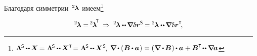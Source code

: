 \begin{otherlanguage}{russian}
\vspace{-0.16em}
Благодаря симметрии~${^2\hspace{-0.2ex}\bm{\lambda}}$ имеем\footnote{${%
\bm{\Lambda}^{\hspace{-0.16ex}\mathsf{S}} \hspace{-0.1ex} \dotdotp \hspace{-0.1ex} \bm{X} \hspace{-0.2ex} =
\hspace{.1ex} \bm{\Lambda}^{\hspace{-0.16ex}\mathsf{S}} \hspace{-0.1ex} \dotdotp \hspace{-0.1ex} \bm{X}^{\T} \hspace{-0.4ex} =
\hspace{.1ex} \bm{\Lambda}^{\hspace{-0.16ex}\mathsf{S}} \hspace{-0.1ex} \dotdotp \hspace{-0.1ex} \bm{X}^{\hspace{.1ex}\mathsf{S}}
\hspace{-0.25ex}}$,
\:\:
${%
\boldnabla \hspace{-0.1ex} \dotp \left( \hspace{.1ex} {\bm{B}} \hspace{-0.1ex} \dotp \bm{a} \hspace{.16ex} \right)
= \left( \hspace{.1ex} \boldnabla \dotp \hspace{-0.15ex} \bm{B} \hspace{.1ex} \right) \hspace{-0.1ex} \dotp \bm{a} \hspace{.1ex}
+ \bm{B}^{\T} \hspace{-0.3ex} \dotdotp \boldnabla \hspace{-0.15ex} \bm{a}
}$}

\nopagebreak\vspace{-0.2em}\begin{equation*}
{^2\hspace{-0.2ex}\bm{\lambda}} = \hspace{-0.2ex} {^2\hspace{-0.2ex}\bm{\lambda}}^{\hspace{-0.33ex}\T}
\: \Rightarrow \:
\hspace{.12ex}{^2\hspace{-0.2ex}\bm{\lambda}} \dotdotp \hspace{-0.15ex} \boldnabla \variation{\currentlocationvector}^{\mathsf{S}} \hspace{-0.2ex}
= {^2\hspace{-0.2ex}\bm{\lambda}} \dotdotp \hspace{-0.15ex} \boldnabla \variation{\currentlocationvector}^{\T}
\hspace{-0.4ex} ,
\end{equation*}


\end{otherlanguage}

